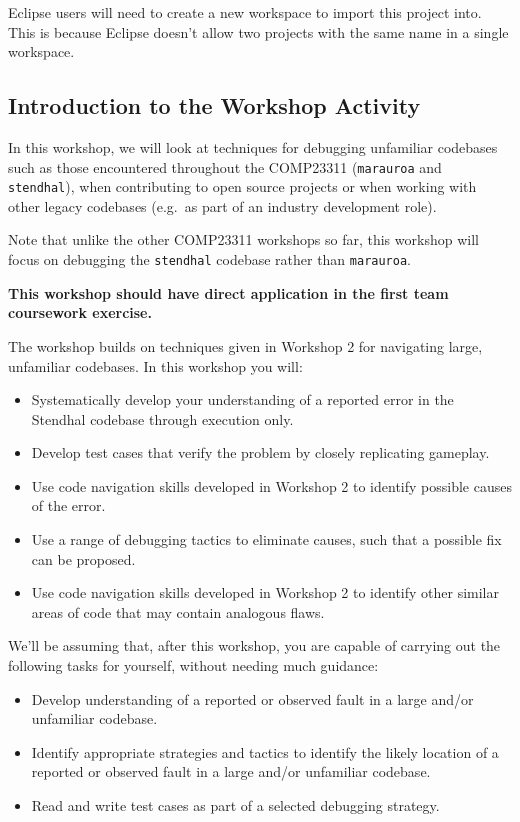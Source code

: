 \documentclass[
]{book}
\providecommand{\tightlist}{%
  \setlength{\itemsep}{0pt}\setlength{\parskip}{0pt}}
\begin{document}
Eclipse users will need to create a new workspace to import this project into. This is because Eclipse doesn't allow two projects with the same name in a single workspace.

\hypertarget{introw}{%
\subsection{Introduction to the Workshop Activity}\label{introw}}

In this workshop, we will look at techniques for debugging unfamiliar codebases such as
those encountered throughout the COMP23311 (\texttt{marauroa} and \texttt{stendhal}), when contributing
to open source projects or when working with other legacy codebases (e.g.~as part of an industry
development role).

Note that unlike the other COMP23311 workshops so far, this workshop will focus on debugging the \texttt{stendhal} codebase rather than \texttt{marauroa}.

\textbf{This workshop should have direct application in the first team coursework exercise.}

The workshop builds on techniques given in Workshop 2 for navigating large, unfamiliar codebases.
In this workshop you will:

\begin{itemize}
\tightlist
\item
  Systematically develop your understanding of a reported error in the Stendhal codebase through execution only.
\item
  Develop test cases that verify the problem by closely replicating gameplay.
\item
  Use code navigation skills developed in Workshop 2 to identify possible causes of the error.
\item
  Use a range of debugging tactics to eliminate causes, such that a possible fix can be proposed.
\item
  Use code navigation skills developed in Workshop 2 to identify other similar areas of code that may contain analogous flaws.
\end{itemize}

We'll be assuming that, after this workshop, you are capable of carrying out the following tasks for yourself, without needing much guidance:

\begin{itemize}
\tightlist
\item
  Develop understanding of a reported or observed fault in a large and/or unfamiliar codebase.
\item
  Identify appropriate strategies and tactics to identify the likely location of a reported or observed fault in a large and/or unfamiliar codebase.
\item
  Read and write test cases as part of a selected debugging strategy.
\end{itemize}
\end{document}
